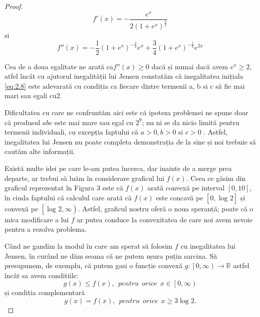 \documentclass[a4paper,12pt,oneside]{report}
\begin{document}
\begin{proof}
\begin{displaymath}
  {f}'\left ( x \right ) = -\frac{e^{x}}{2 \left ( 1 + e^{x} \right )^{\frac{3}{2}}}
\end{displaymath}
si
\begin{displaymath}
  {f}''\left ( x \right ) = -\frac{1}{2}\left (  1 + e^{x} \right )^{-\frac{3}{2}}e^{x} + \frac{3}{4}\left ( 1 + e^{x} \right )^{-\frac{5}{2}}e^{2x}
\end{displaymath}

Cea de a doua egalitate ne arată ca\({f}''\left ( x \right ) \geq 0\) dacă și numai dacă avem \(e^{x}\geq 2\), atfel încât cu ajutorul inegalității lui Jensen  constatăm că inegalitatea inițiala \ref{eq:2.8}  este adevarată cu condiția ca fiecare dintre termenii a, b si c să fie mai mari sau egali cu2.

Dificultatea cu care ne confruntăm aici este că ipoteza problemei  ne spune doar  că produsul \(abc\) este mai mare sau egal cu \(2^{9}\); nu ni se da nicio  limită pentru termenii  individuali, cu excepția faptului că \( a > 0, b > 0 \) si \(c > 0\) . Astfel, inegalitatea lui Jensen nu poate completa demonstrația de la sine și noi trebuie să cautăm alte informații.

Există multe idei pe care le-am putea încerca, dar inainte de a merge prea departe,  ar trebui să luăm în considerare graficul lui \(f\left ( x \right )\). Ceea ce  găsim  din graficul  reprezentat în Figura 3 este că \(f\left ( x \right ) \) arată convexă pe interval \(\left [ 0, 10 \right ]  \), în ciuda faptului că calculul care arată că \(f\left ( x \right ) \) este concavă pe \(\left [ 0, \log _{} 2\right ] \) și convexă pe \(\left [ \log _{} 2 , \infty \right ) \). Astfel, graficul nostru oferă o noua speranță; poate că o mica modificare a lui \(f\) ar putea conduce la convexitatea de care noi avem nevoie pentru a rezolva problema.

Când ne gandim la modul în care am sperat să folosim \(f\) cu inegalitatea lui Jensen, în curând ne dăm seama că ne putem ușura puțin sarcina. Să presupunem, de exemplu, că putem gasi o funcție convexă \(g : \left [ 0 , \infty  \right ) \to \mathbb{R}\) astfel încât sa avem  conditiile:
\begin{displaymath}
  g\left ( x \right ) \leq  f\left ( x  \right ),~~ pentru~~ orice~~ x \in  \left [ 0 , \infty  \right )    \label{eq:2.9} \tag{2.9}
\end{displaymath}
și condiția complementară
\begin{displaymath}
  g \left ( x \right ) = f \left ( x \right ), ~~pentru~~ orice~~  x\geq 3 \log 2. \label{eq:2.10} \tag{2.10}
\end{displaymath}


\end{proof}
\end{document}

